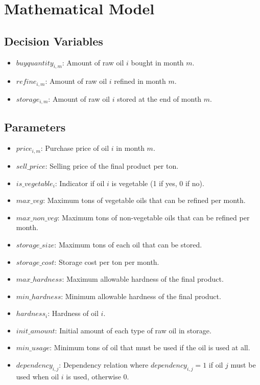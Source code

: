 \documentclass{article}
\begin{document}
\section*{Mathematical Model}

\subsection*{Decision Variables}
\begin{itemize}
    \item \( buyquantity_{i,m} \): Amount of raw oil \( i \) bought in month \( m \).
    \item \( refine_{i,m} \): Amount of raw oil \( i \) refined in month \( m \).
    \item \( storage_{i,m} \): Amount of raw oil \( i \) stored at the end of month \( m \).
\end{itemize}

\subsection*{Parameters}
\begin{itemize}
    \item \( price_{i,m} \): Purchase price of oil \( i \) in month \( m \).
    \item \( sell\_price \): Selling price of the final product per ton.
    \item \( is\_vegetable_{i} \): Indicator if oil \( i \) is vegetable (1 if yes, 0 if no).
    \item \( max\_veg \): Maximum tons of vegetable oils that can be refined per month.
    \item \( max\_non\_veg \): Maximum tons of non-vegetable oils that can be refined per month.
    \item \( storage\_size \): Maximum tons of each oil that can be stored.
    \item \( storage\_cost \): Storage cost per ton per month.
    \item \( max\_hardness \): Maximum allowable hardness of the final product.
    \item \( min\_hardness \): Minimum allowable hardness of the final product.
    \item \( hardness_{i} \): Hardness of oil \( i \).
    \item \( init\_amount \): Initial amount of each type of raw oil in storage.
    \item \( min\_usage \): Minimum tons of oil that must be used if the oil is used at all.
    \item \( dependency_{i,j} \): Dependency relation where \( dependency_{i,j} = 1 \) if oil \( j \) must be used when oil \( i \) is used, otherwise 0.
\end{itemize}
\end{document}
